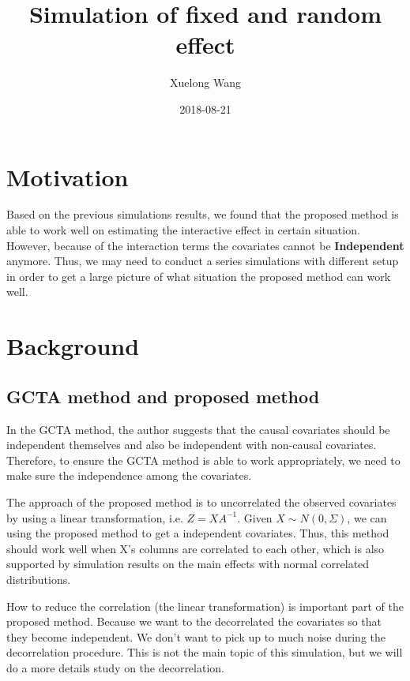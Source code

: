 \documentclass[]{article}
\title{Simulation of fixed and random effect}
\author{Xuelong Wang}
\date{2018-08-21}
\begin{document}
\maketitle

{
\setcounter{tocdepth}{2}
\tableofcontents
}
\section{Motivation}\label{motivation}

Based on the previous simulations results, we found that the proposed
method is able to work well on estimating the interactive effect in
certain situation. However, because of the interaction terms the
covariates cannot be \textbf{Independent} anymore. Thus, we may need to
conduct a series simulations with different setup in order to get a
large picture of what situation the proposed method can work well.

\section{Background}\label{background}

\subsection{GCTA method and proposed
method}\label{gcta-method-and-proposed-method}

In the GCTA method, the author suggests that the causal covariates
should be independent themselves and also be independent with non-causal
covariates. Therefore, to ensure the GCTA method is able to work
appropriately, we need to make sure the independence among the
covariates.

The approach of the proposed method is to uncorrelated the observed
covariates by using a linear transformation, i.e. \(Z = XA^{-1}\). Given
\(X \sim N(0, \Sigma)\), we can using the proposed method to get a
independent covariates. Thus, this method should work well when X's
columns are correlated to each other, which is also supported by
simulation results on the main effects with normal correlated
distributions.

How to reduce the correlation (the linear transformation) is important
part of the proposed method. Because we want to the decorrelated the
covariates so that they become independent. We don't want to pick up to
much noise during the decorrelation procedure. This is not the main
topic of this simulation, but we will do a more details study on the
decorrelation.
\end{document}

